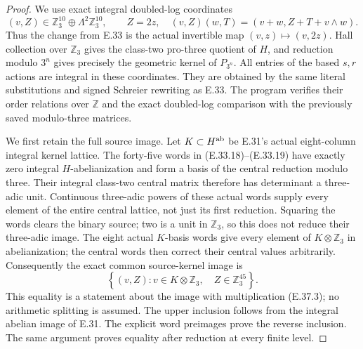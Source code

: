 \begin{proof}
We use exact integral doubled-log coordinates
\[
             (v,Z)\in\mathbb Z_3^{10}
                         \oplus\Lambda^2\mathbb Z_3^{10},
       \qquad Z=2z,
 \quad
 (v,Z)(w,T)=(v+w,Z+T+v\wedge w).
 \tag{E.37.3}
\]
Thus the change from E.33 is the actual invertible
map $(v,z)\mapsto(v,2z)$.
Hall collection over $\mathbb Z_3$ gives the
class-two pro-three quotient of $H$, and reduction
modulo $3^n$ gives precisely the geometric kernel
of $P_{3^n}$.  All entries of the based $s,r$
actions are integral in these coordinates.
They are obtained by the same literal substitutions
and signed Schreier rewriting as E.33.
The program verifies their order relations over
$\mathbb Z$ and the exact doubled-log comparison
with the previously saved modulo-three matrices.

We first retain the full source image.
Let $K\subset H^{\rm ab}$ be E.31's actual
eight-column integral kernel lattice.
The forty-five words in
\textup{(E.33.18)--(E.33.19)} have exactly zero
integral $H$-abelianization and form a basis
of the central reduction modulo three.
Their integral class-two central matrix therefore
has determinant a three-adic unit.  Continuous
three-adic powers of these actual words supply
every element of the entire central lattice,
not just its first reduction.
Squaring the words clears the binary source;
two is a unit in $\mathbb Z_3$, so this does not
reduce their three-adic image.
The eight actual $K$-basis words give every
element of $K\otimes\mathbb Z_3$ in abelianization;
the central words then correct their central
values arbitrarily.  Consequently the exact
common source-kernel image is
\[
 \left\{(v,Z):
       v\in K\otimes\mathbb Z_3,\quad
       Z\in\mathbb Z_3^{45}\right\}.
 \tag{E.37.4}
\]
This equality is a statement about the image
with multiplication \textup{(E.37.3)}; no
arithmetic splitting is assumed.
The upper inclusion follows from the integral
abelian image of E.31.  The explicit word
preimages prove the reverse inclusion.
The same argument proves equality after
reduction at every finite level.


\end{proof}
